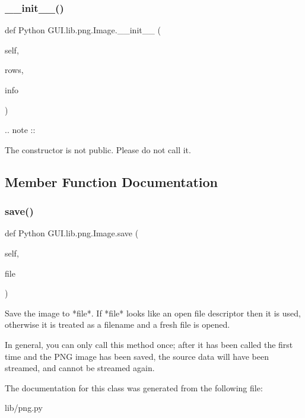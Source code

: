 \subsubsection{\texorpdfstring{\+\_\+\+\_\+init\+\_\+\+\_\+()}{\_\_init\_\_()}}
{\footnotesize\ttfamily def Python G\+U\+I.\+lib.\+png.\+Image.\+\_\+\+\_\+init\+\_\+\+\_\+ (\begin{DoxyParamCaption}\item[{}]{self,  }\item[{}]{rows,  }\item[{}]{info }\end{DoxyParamCaption})}

\begin{DoxyVerb}.. note ::

  The constructor is not public.  Please do not call it.
\end{DoxyVerb}
 

\subsection{Member Function Documentation}
\mbox{\label{class_python_01_g_u_i_1_1lib_1_1png_1_1_image_a6c261eaa593765a1683a2858947f49b6}} 
\subsubsection{\texorpdfstring{save()}{save()}}
{\footnotesize\ttfamily def Python G\+U\+I.\+lib.\+png.\+Image.\+save (\begin{DoxyParamCaption}\item[{}]{self,  }\item[{}]{file }\end{DoxyParamCaption})}

\begin{DoxyVerb}Save the image to *file*.  If *file* looks like an open file
descriptor then it is used, otherwise it is treated as a
filename and a fresh file is opened.

In general, you can only call this method once; after it has
been called the first time and the PNG image has been saved, the
source data will have been streamed, and cannot be streamed
again.
\end{DoxyVerb}
 

The documentation for this class was generated from the following file\+:\begin{DoxyCompactItemize}
\item 
lib/png.\+py\end{DoxyCompactItemize}
